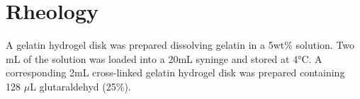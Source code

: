 \section{Rheology}
A gelatin hydrogel disk was prepared dissolving gelatin in a 5wt\% solution. Two mL of the solution was loaded into a 20mL syninge and stored at 4\si{\degreeCelsius}. A corresponding 2mL cross-linked gelatin hydrogel disk was prepared containing 128 $\mu$L glutaraldehyd (25\%). 

